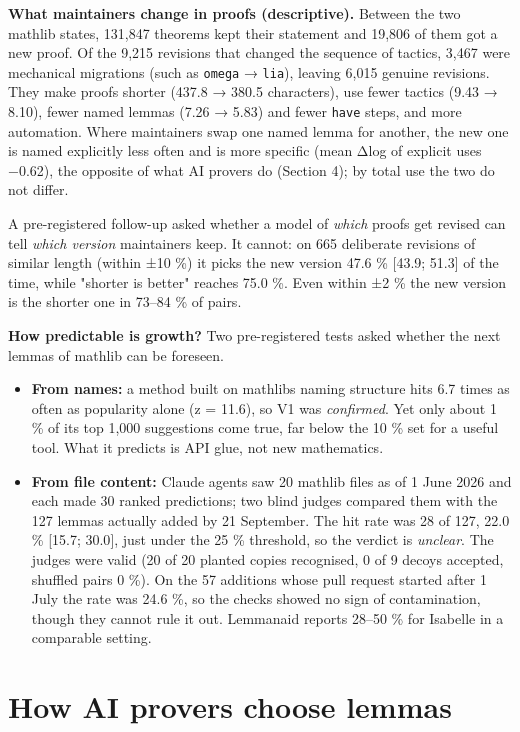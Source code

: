 \documentclass[11pt,a4paper]{article}
\providecommand{\tightlist}{\setlength{\itemsep}{0pt}\setlength{\parskip}{0pt}}
\begin{document}
\textbf{What maintainers change in proofs (descriptive).} Between the two mathlib states, 131,847 theorems kept their statement and 19,806 of them got a new proof. Of the 9,215 revisions that changed the sequence of tactics, 3,467 were mechanical migrations (such as \texttt{omega} → \texttt{lia}), leaving 6,015 genuine revisions. They make proofs shorter (437.8 → 380.5 characters), use fewer tactics (9.43 → 8.10), fewer named lemmas (7.26 → 5.83) and fewer \texttt{have} steps, and more automation. Where maintainers swap one named lemma for another, the new one is named explicitly less often and is more specific (mean Δlog of explicit uses −0.62), the opposite of what AI provers do (Section 4); by total use the two do not differ.

A pre-registered follow-up asked whether a model of \emph{which} proofs get revised can tell \emph{which version} maintainers keep. It cannot: on 665 deliberate revisions of similar length (within ±10 \%) it picks the new version 47.6 \% {[}43.9; 51.3{]} of the time, while "shorter is better" reaches 75.0 \%. Even within ±2 \% the new version is the shorter one in 73--84 \% of pairs.

\textbf{How predictable is growth?} Two pre-registered tests asked whether the next lemmas of mathlib can be foreseen.

\begin{itemize}
\tightlist
\item
  \textbf{From names:} a method built on mathlib\textquotesingle s naming structure hits 6.7 times as often as popularity alone (z = 11.6), so V1 was \emph{confirmed}. Yet only about 1 \% of its top 1,000 suggestions come true, far below the 10 \% set for a useful tool. What it predicts is API glue, not new mathematics.
\item
  \textbf{From file content:} Claude agents saw 20 mathlib files as of 1 June 2026 and each made 30 ranked predictions; two blind judges compared them with the 127 lemmas actually added by 21 September. The hit rate was 28 of 127, 22.0 \% {[}15.7; 30.0{]}, just under the 25 \% threshold, so the verdict is \emph{unclear}. The judges were valid (20 of 20 planted copies recognised, 0 of 9 decoys accepted, shuffled pairs 0 \%). On the 57 additions whose pull request started after 1 July the rate was 24.6 \%, so the checks showed no sign of contamination, though they cannot rule it out. Lemmanaid reports 28--50 \% for Isabelle in a comparable setting.
\end{itemize}

\section{How AI provers choose lemmas}
\end{document}
